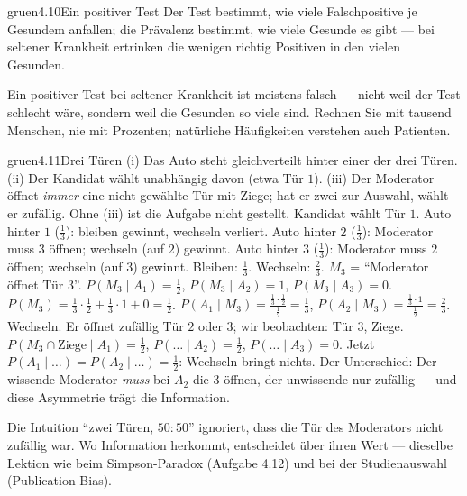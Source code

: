 \begin{loesungkarte}{gruen}{4.10}{Ein positiver Test}
Der Test bestimmt, wie viele Falschpositive je Gesundem anfallen; die Prävalenz bestimmt, wie viele Gesunde es gibt --- bei seltener Krankheit ertrinken die wenigen richtig Positiven in den vielen Gesunden.
\begin{mitnehmen}\kastentext
Ein positiver Test bei seltener Krankheit ist meistens falsch --- nicht weil der Test schlecht wäre, sondern weil die Gesunden so viele sind. Rechnen Sie mit tausend Menschen, nie mit Prozenten; natürliche Häufigkeiten verstehen auch Patienten.
\end{mitnehmen}
\end{loesungkarte}

\begin{loesungkarte}{gruen}{4.11}{Drei Türen}
(i) Das Auto steht gleichverteilt hinter einer der drei Türen. (ii) Der Kandidat wählt unabhängig davon (etwa Tür $1$). (iii) Der Moderator öffnet \emph{immer} eine nicht gewählte Tür mit Ziege; hat er zwei zur Auswahl, wählt er zufällig. Ohne (iii) ist die Aufgabe nicht gestellt.
Kandidat wählt Tür $1$. Auto hinter $1$ ($\frac13$): bleiben gewinnt, wechseln verliert. Auto hinter $2$ ($\frac13$): Moderator muss $3$ öffnen; wechseln (auf $2$) gewinnt. Auto hinter $3$ ($\frac13$): Moderator muss $2$ öffnen; wechseln (auf $3$) gewinnt. Bleiben: $\frac13$. Wechseln: $\frac23$.
$M_3$ = \enquote{Moderator öffnet Tür $3$}. $P(M_3\mid A_1) = \frac12$, $P(M_3\mid A_2) = 1$, $P(M_3\mid A_3) = 0$. $P(M_3) = \frac13\cdot\frac12 + \frac13\cdot1 + 0 = \frac12$. $P(A_1\mid M_3) = \frac{\frac13\cdot\frac12}{\frac12} = \frac13$, $P(A_2\mid M_3) = \frac{\frac13\cdot1}{\frac12} = \frac23$. Wechseln.
Er öffnet zufällig Tür $2$ oder $3$; wir beobachten: Tür $3$, Ziege. $P(M_3\cap\text{Ziege}\mid A_1) = \frac12$, $P(\dots\mid A_2) = \frac12$, $P(\dots\mid A_3) = 0$. Jetzt $P(A_1\mid\dots) = P(A_2\mid\dots) = \frac12$: Wechseln bringt nichts. Der Unterschied: Der wissende Moderator \emph{muss} bei $A_2$ die $3$ öffnen, der unwissende nur zufällig --- und diese Asymmetrie trägt die Information.
\begin{mitnehmen}\kastentext
Die Intuition \enquote{zwei Türen, $50 : 50$} ignoriert, dass die Tür des Moderators nicht zufällig war. Wo Information herkommt, entscheidet über ihren Wert --- dieselbe Lektion wie beim Simpson-Paradox (Aufgabe 4.12) und bei der Studienauswahl (Publication Bias).
\end{mitnehmen}
\end{loesungkarte}

